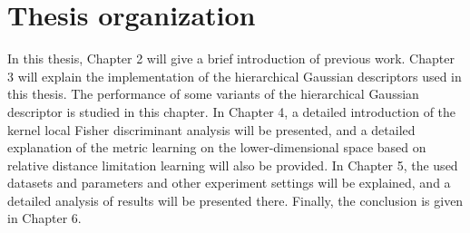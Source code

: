 \section{Thesis organization}
In this thesis, Chapter 2 will give a brief introduction of previous work. Chapter 3 will explain the implementation of the hierarchical Gaussian descriptors used in this thesis. The performance of some variants of the hierarchical Gaussian descriptor is studied in this chapter. In Chapter 4, a detailed introduction of the kernel local Fisher discriminant analysis will be presented, and a detailed explanation of the metric learning on the lower-dimensional space based on relative distance limitation learning will also be provided.
In Chapter 5, the used datasets and parameters and other experiment settings will be explained, and a detailed analysis of results will be presented there. Finally, the conclusion is given in Chapter 6.




